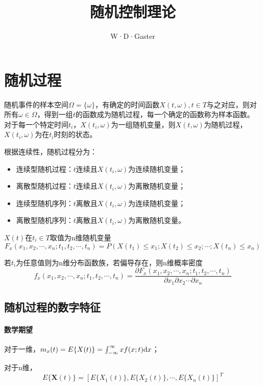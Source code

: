 \documentclass[11pt,a4paper]{ctexart}
\title{随机控制理论}
\author{W·D·Gaster}
\renewcommand{\d}{{\rm d}}
\begin{document}
\maketitle
\thispagestyle{empty}
\newpage

\tableofcontents
\thispagestyle{empty}
\newpage

\setcounter{page}{1}
\section{随机过程}
    随机事件的样本空间$\Omega=\{\omega\}$，有确定的时间函数$X(t,\omega),t\in T$与之对应，则对所有$\omega\in\Omega$，得到一组$t$的函数成为随机过程，每一个确定的函数称为样本函数。
    对于每一个特定时间$t_i$，$X(t_i,\omega)$为一组随机变量，则$X(t,\omega)$为随机过程，$X(t_i,\omega)$为在$t_i$时刻的状态。

    根据连续性，随机过程分为：
    \begin{itemize}
        \item 连续型随机过程：$t$连续且$X(t_i,\omega)$为连续随机变量；
        \item 离散型随机过程：$t$连续且$X(t_i,\omega)$为离散随机变量；
        \item 连续型随机序列：$t$离散且$X(t_i,\omega)$为连续随机变量；
        \item 离散型随机序列：$t$离散且$X(t_i,\omega)$为离散随机变量。
    \end{itemize}

    $X(t)$在$t_i\in T$取值为n维随机变量
    \[
    F_x(x_1,x_2,\cdots,x_n;t_1,t_2,\cdots,t_n)=P(X(t_1)\leqslant x_1;X(t_2)\leqslant x_2;\cdots;X(t_n)\leqslant x_n)
    \]
    
    若$t_i$为任意值则为n维分布函数族，若偏导存在，则n维概率密度
    \[
    f_x(x_1,x_2,\cdots,x_n;t_1,t_2,\cdots,t_n)=\dfrac{\partial F_x(x_1,x_2,\cdots,x_n;t_1,t_2,\cdots,t_n)}{\partial x_1\partial x_2\cdots\partial x_n}
    \]
    \subsection{随机过程的数字特征}
        \paragraph{数学期望}\leavevmode

        对于一维，$m_x(t)=E\{X(t)\}=\int_{-\infty}^{\infty}xf(x;t)\d x$；
        
        对于n维，
        \[
        E\{\bm{X}(t)\}=[E\{X_1(t)\},E\{X_2(t)\},\cdots,E\{X_n(t)\}]^T
        \]
\end{document}
